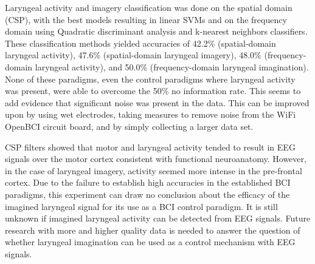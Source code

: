 \documentclass{article}
\begin{document}
Laryngeal activity and imagery classification was done on the spatial domain (CSP), with the best models resulting in linear SVMs and on the frequency domain using Quadratic discriminant analysis and k-nearest neighbors classifiers. These classification methods yielded accuracies of 42.2\% (spatial-domain laryngeal activity), 47.6\% (spatial-domain laryngeal imagery), 48.0\% (frequency-domain laryngeal activity), and 50.0\% (frequency-domain laryngeal imagination). None of these paradigms, even the control paradigms where laryngeal activity was present, were able to overcome the 50\% no information rate. This seems to add evidence that significant noise was present in the data. This can be improved upon by using wet electrodes, taking measures to remove noise from the WiFi OpenBCI circuit board, and by simply collecting a larger data set.

CSP filters showed that motor and laryngeal activity tended to result in EEG signals over the motor cortex consistent with functional neuroanatomy. However, in the case of laryngeal imagery, activity seemed more intense in the pre-frontal cortex. Due to the failure to establish high accuracies in the established BCI paradigms, this experiment can draw no conclusion about the efficacy of the imagined laryngeal signal for its use as a BCI control paradigm. It is still unknown if imagined laryngeal activity can be detected from EEG signals. Future research with more and higher quality data is needed to answer the question of whether laryngeal imagination can be used as a control mechanism with EEG signals.









\end{document}
